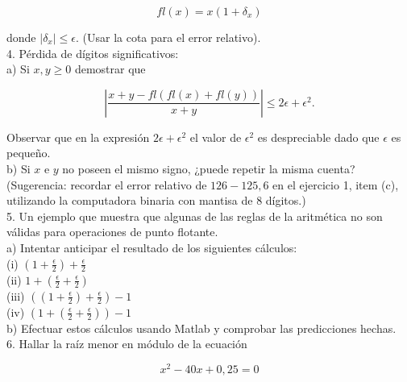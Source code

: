 \documentclass[10pt]{book}
\begin{document}
$$
f l(x)=x\left(1+\delta_{x}\right)
$$

donde $\left|\delta_{x}\right| \leq \epsilon$. (Usar la cota para el error relativo).\\
4. Pérdida de dígitos significativos:\\
a) Si $x, y \geq 0$ demostrar que

$$
\left|\frac{x+y-f l(f l(x)+f l(y))}{x+y}\right| \leq 2 \epsilon+\epsilon^{2} .
$$

Observar que en la expresión $2 \epsilon+\epsilon^{2}$ el valor de $\epsilon^{2}$ es despreciable dado que $\epsilon$ es pequeño.\\
b) Si $x$ e $y$ no poseen el mismo signo, ¿puede repetir la misma cuenta? (Sugerencia: recordar el error relativo de $126-125,6$ en el ejercicio 1, item (c), utilizando la computadora binaria con mantisa de 8 dígitos.)\\
5. Un ejemplo que muestra que algunas de las reglas de la aritmética no son válidas para operaciones de punto flotante.\\
a) Intentar anticipar el resultado de los siguientes cálculos:\\
(i) $\left(1+\frac{\epsilon}{2}\right)+\frac{\epsilon}{2}$\\
(ii) $1+\left(\frac{\epsilon}{2}+\frac{\epsilon}{2}\right)$\\
(iii) $\left(\left(1+\frac{\epsilon}{2}\right)+\frac{\epsilon}{2}\right)-1$\\
(iv) $\left(1+\left(\frac{\epsilon}{2}+\frac{\epsilon}{2}\right)\right)-1$\\
b) Efectuar estos cálculos usando Matlab y comprobar las predicciones hechas.\\
6. Hallar la raíz menor en módulo de la ecuación

$$
x^{2}-40 x+0,25=0
$$
\end{document}

